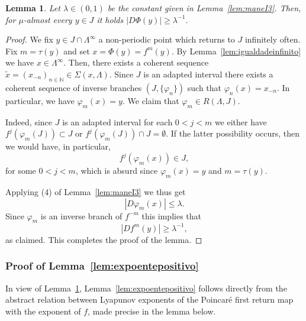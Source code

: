 \documentclass[12pt,a4paper,twoside]{article}
\theoremstyle{plain}
\newtheorem{lemma}[theorem]{Lemma}
\theoremstyle{definition}
\newcommand{\N}{{\mathbb N}}
\newcommand{\tix}{\tilde{x}}
\begin{document}
\begin{lemma}
    \label{lem:estimapoincare}
Let $\lambda\in(0,1)$ be the constant given in Lemma~\ref{lem:maneI3}. Then, for $\mu$-almost every $y\in J$ it holds $|D\Phi(y)|\geq \lambda^{-1}$.
\end{lemma}
\begin{proof}
We fix $y\in J\cap\Lambda^{\infty}$ a non-periodic point which returns to $J$ infinitely often. Fix $m=\tau(y)$ and set $x=\Phi(y)=f^m(y)$. By Lemma~\ref{lem:igualdadeinfinito} we have $x\in\Lambda^\infty$. Then, there exists a coherent sequence $\tix=(x_{-n})_{n\in\N}\in\Sigma(x,\Lambda)$. Since $J$ is an adapted interval there exists a coherent sequence of inverse branches $(J,\{\varphi_n\})$ such that $\varphi_n(x)=x_{-n}$. In particular, we have $\varphi_m(x)=y$. We claim that $\varphi_m\in R(\Lambda,J)$. 

Indeed, since $J$ is an adapted interval for each $0<j<m$ we either have $f^j(\varphi_m(J))\subset J$ or $f^j(\varphi_m(J))\cap J=\emptyset$. If the latter possibility occurs, then we would have, in particular, 
\[
f^j(\varphi_m(x))\in J,
\]
for some $0<j<m$, which is absurd since $\varphi_m(x)=y$ and $m=\tau(y)$. 

Applying (4) of Lemma~\ref{lem:maneI3} we thus get 
\[
|D\varphi_m(x)|\leq\lambda.
\]
Since $\varphi_m$ is an inverse branch of $f^{-m}$ this implies that 
\[
|Df^m(y)|\geq\lambda^{-1},
\]
as claimed. This completes the proof of the lemma.
\end{proof}

\subsubsection{Proof of Lemma~\ref{lem:expoentepositivo}}


In view of Lemma~\ref{lem:estimapoincare}, Lemma~\ref{lem:expoentepositivo} follows directly from the abstract relation between Lyapunov exponents of the Poincaré first return map with the exponent of $f$, made precise in the lemma below.
\end{document}
